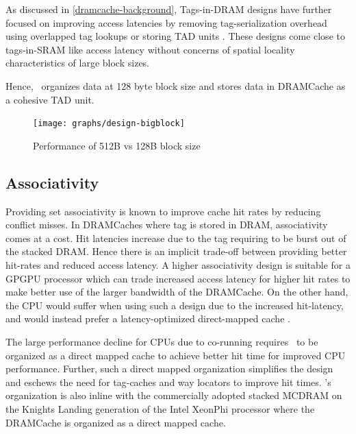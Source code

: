 \par As discussed in \ref{dramcache-background}, Tags-in-DRAM designs have further focused on improving access latencies by removing tag-serialization overhead using overlapped tag lookups \cite{loh-hill} or storing TAD units \cite{alloy}. These designs come close to tags-in-SRAM like access latency without concerns of spatial locality characteristics of large block sizes. 
\par Hence, \cachename\ organizes data at 128 byte block size and stores data in DRAMCache as a cohesive TAD unit.

\begin{figure}[htbp]
   \centering
   \texttt{[image: graphs/design-bigblock]}
   \caption{Performance of 512B vs 128B block size}	
   \label{fig:design-bigblock}
\end{figure}

\subsection{Associativity} 
Providing set associativity is known to improve cache hit rates by reducing conflict misses. In DRAMCaches where tag is stored in DRAM,  associativity comes at a cost. Hit latencies increase due to the tag requiring to be burst out of the stacked DRAM. Hence there is an implicit trade-off between providing better hit-rates and reduced access latency. A higher associativity design is suitable for a GPGPU processor which can trade increased access latency for higher hit rates to make better use of the larger bandwidth of the DRAMCache. On the other hand, the CPU would suffer when using such a design due to the increased hit-latency, and  would instead prefer a latency-optimized direct-mapped cache \cite{alloy}.
\par The large performance decline for CPUs due to co-running requires \cachename\ to be organized as a direct mapped cache to achieve better hit time for improved CPU performance. Further, such a direct mapped organization simplifies the design and eschews the need for tag-caches \cite{atcache} and way locators \cite{bimodal} to improve hit times. \cachename's organization is also inline with the commercially adopted stacked MCDRAM on the Knights Landing generation of the Intel XeonPhi processor \cite{xeonphi} where the DRAMCache is organized as a direct mapped cache.

